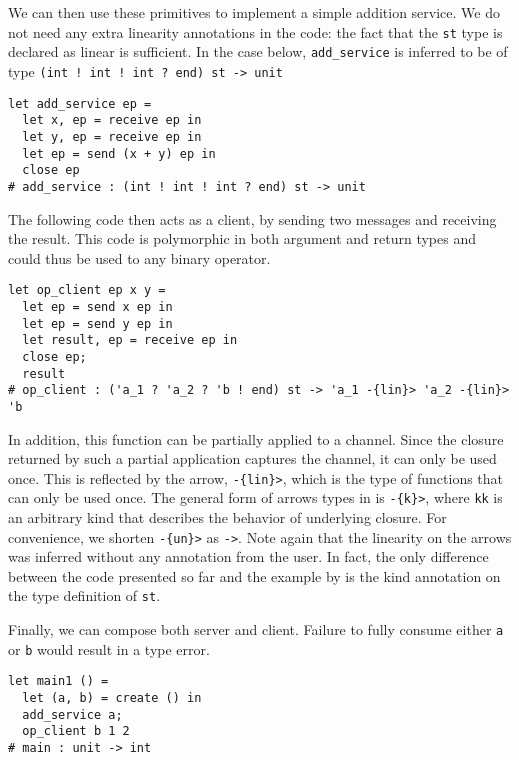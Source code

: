 
We can then use these primitives to implement a simple addition service.
We do not need any extra linearity annotations in the code: the fact
that the \texttt{st} type is declared as linear is sufficient.
In the case below, \lstinline{add_service} is inferred to be of type
\lstinline{(int ! int ! int ? end) st -> unit}

\begin{lstlisting}
let add_service ep =
  let x, ep = receive ep in
  let y, ep = receive ep in
  let ep = send (x + y) ep in
  close ep
# add_service : (int ! int ! int ? end) st -> unit
\end{lstlisting}

The following code then acts as a client, by sending two messages
and receiving the result.
This code is polymorphic in both argument and return types and could thus
be used to any binary operator.
%
\begin{lstlisting}
let op_client ep x y =
  let ep = send x ep in
  let ep = send y ep in
  let result, ep = receive ep in
  close ep;
  result
# op_client : ('a_1 ? 'a_2 ? 'b ! end) st -> 'a_1 -{lin}> 'a_2 -{lin}> 'b
\end{lstlisting}

In addition, this function can be partially
applied to a channel. Since the closure returned by such a partial
application captures the channel, it can only be used once.
This is reflected by the arrow, \lstinline/-{lin}>/, which is the
type of functions that can only be used once.
The general form of arrows types in \lang is \lstinline/-{k}>/, where
\lstinline/kk/ is an arbitrary kind that describes the behavior of
underlying closure.
For convenience, we shorten \lstinline/-{un}>/ as \lstinline/->/.
Note again that the linearity on the arrows was inferred without
any annotation from the user. In fact, the only difference between the code
presented so far and the example by
\citet{DBLP:journals/jfp/Padovani17}
is the kind annotation on the type definition of \lstinline/st/.


Finally, we can compose both server and client.
Failure to fully consume either \lstinline/a/ or \lstinline/b/
would result in a type error.
\begin{lstlisting}
let main1 () =
  let (a, b) = create () in
  add_service a;
  op_client b 1 2
# main : unit -> int
\end{lstlisting}


